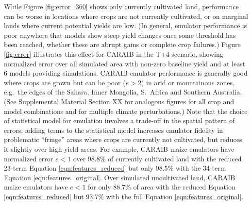 \documentclass[gmd, manuscript]{copernicus} %
\begin{document}
While Figure \ref{fig:error_360} shows only currently cultivated land, performance can be worse in locations where crops are not currently cultivated, or on marginal lands where current potential yields are low. (In general, emulator performance is poor anywhere that models show steep yield changes once some threshold has been reached, whether these are abrupt gains or complete crop failures.) 
Figure \ref{fig:error} illustrates this effect for CARAIB in the T+4 scenario, showing normalized error over all simulated area with non-zero baseline yield and at least 6 models providing simulations. CARAIB emulator performance is generally good where crops are grown but can be poor ($e > 2$) in arid or mountainous zones, e.g.\ the edges of the Sahara, Inner Mongolia, S.\ Africa and Southern Australia. (See Supplemental Material Section XX for analogous figures for all crop and model combinations and for multiple climate perturbations.)
Note that the choice of statistical model for emulation involves a trade-off in the spatial pattern of errors: adding terms to the statistical model increases emulator fidelity in problematic ``fringe'' areas where crops are currently not cultivated, but reduces it slightly over high-yield areas.
For example, CARAIB maize emulators have normalized error $e < 1$ over 98.8\% of currently cultivated land with the reduced 23-term Equation \ref{eqn:features_reduced} but only 98.5\% with the 34-term Equation \ref{eqn:features_original}. 
Over simulated uncultivated land, CARAIB maize emulators have $e < 1$ for only 88.7\% of area with the reduced Equation \ref{eqn:features_reduced} but 93.7\% with the full Equation \ref{eqn:features_original}. 

\end{document}
